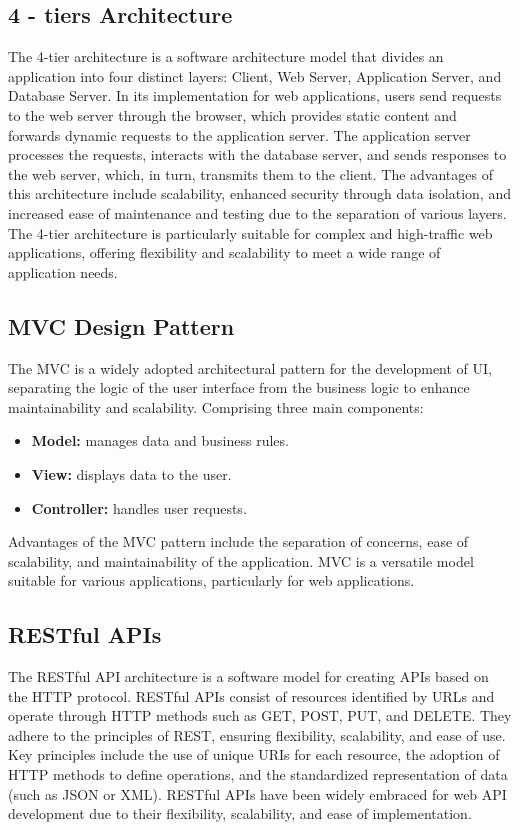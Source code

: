 \subsection{4 - tiers Architecture}
The 4-tier architecture is a software architecture model that divides an application into four distinct layers: Client, Web Server, Application Server, and Database Server.
In its implementation for web applications, users send requests to the web server through the browser, which provides static content and forwards dynamic requests to the application server.
The application server processes the requests, interacts with the database server, and sends responses to the web server, which, in turn, transmits them to the client.
The advantages of this architecture include scalability, enhanced security through data isolation, and increased ease of maintenance and testing due to the separation of various layers.
The 4-tier architecture is particularly suitable for complex and high-traffic web applications, offering flexibility and scalability to meet a wide range of application needs.

\subsection{MVC Design Pattern}
The MVC is a widely adopted architectural pattern for the development of UI, separating the logic of the user interface from the business logic to enhance maintainability and scalability.
Comprising three main components:
\begin{itemize}
    \item \textbf{Model:} manages data and business rules.
    \item \textbf{View:} displays data to the user.
    \item \textbf{Controller:} handles user requests.
\end{itemize}
Advantages of the MVC pattern include the separation of concerns, ease of scalability, and maintainability of the application.
MVC is a versatile model suitable for various applications, particularly for web applications.

\subsection{RESTful APIs}
The RESTful API architecture is a software model for creating APIs based on the HTTP protocol.
RESTful APIs consist of resources identified by URLs and operate through HTTP methods such as GET, POST, PUT, and DELETE.
They adhere to the principles of REST, ensuring flexibility, scalability, and ease of use.
Key principles include the use of unique URIs for each resource, the adoption of HTTP methods to define operations, and the standardized representation of data (such as JSON or XML).
RESTful APIs have been widely embraced for web API development due to their flexibility, scalability, and ease of implementation.

